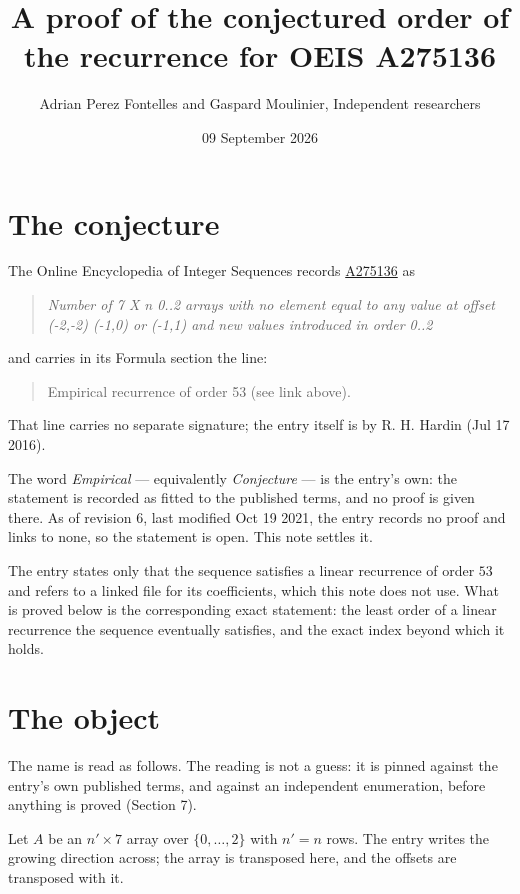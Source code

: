 \documentclass[11pt]{article}
\title{A proof of the conjectured order of the recurrence for OEIS A275136}
\author{Adrian Perez Fontelles and Gaspard Moulinier, Independent researchers}
\date{09 September 2026}
\theoremstyle{definition}
\begin{document}
\maketitle
\section{The conjecture}

The Online Encyclopedia of Integer Sequences records \href{https://oeis.org/A275136}{A275136} as

\begin{quote}\itshape Number of 7 X n 0..2 arrays with no element equal to any value at offset (-2,-2) (-1,0) or (-1,1) and new values introduced in order 0..2\end{quote}

and carries in its Formula section the line:

\begin{quote}\ttfamily Empirical recurrence of order 53 (see link above).\end{quote}

That line carries no separate signature; the entry itself is by R. H. Hardin (Jul 17 2016).

The word {\itshape Empirical} --- equivalently {\itshape Conjecture} --- is the entry's own: the statement is recorded as fitted to the published terms, and no proof is given there. As of revision 6, last modified Oct 19 2021, the entry records no proof and links to none, so the statement is open. This note settles it.

The entry states only that the sequence satisfies a linear recurrence of order $53$ and refers to a linked file for its coefficients, which this note does not use. What is proved below is the corresponding exact statement: the least order of a linear recurrence the sequence eventually satisfies, and the exact index beyond which it holds.

\section{The object}

The name is read as follows. The reading is not a guess: it is pinned against the entry's own published terms, and against an independent enumeration, before anything is proved (Section 7).

Let $A$ be an $n' \times 7$ array over $\{0,\dots,2\}$ with $n' = n$ rows. The entry writes the growing direction across; the array is transposed here, and the offsets are transposed with it.
\end{document}
